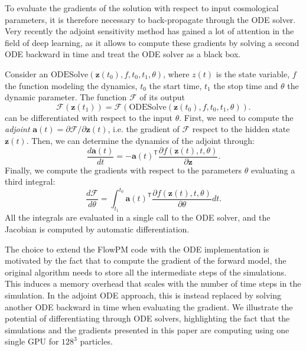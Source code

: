 \documentclass[twocolumn,twocolappendix]{aastex63}
\begin{document}
To evaluate the gradients of the solution with respect to input cosmological parameters, it is therefore necessary to  back-propagate through the ODE solver. Very recently the adjoint sensitivity method \cite{chen2018neural, pontryaginmathematical} has gained a lot of attention in the field of deep learning, as it allows to compute these gradients by solving a second ODE backward in time and treat the ODE solver as a black box. 
 
Consider an $\text{ODESolve}(\textbf{z}(t_0),f,t_0,t_1, \theta)$, 
 where $z(t)$ is the state variable, $f$ the function modeling the dynamics, $t_0$ the start time, $t_1$ the stop time and $\theta$ the dynamic parameter. The function  $\mathcal{F}$ of its output
 \begin{equation}
     \mathcal{F}(\textbf{z}(t_1))=   \mathcal{F} (\text{ODESolve}(\textbf{z}(t_0),f,t_0,t_1, \theta)).
 \end{equation}
can be differentiated with respect to the input $\theta$.
 First, we need to compute the \textit{adjoint} $\textbf{a}(t)=\partial \mathcal{F}/ \partial \textbf{z}(t)$, i.e. the gradient of $\mathcal{F}$ respect to the hidden state $\textbf{z}(t)$.  
 Then, we can determine the dynamics of the adjoint through:
 \begin{equation}
     \frac{d \textbf{a}(t)}{dt}=-\textbf{a}(t)^{ \mathsf{T}}\frac{\partial f (\textbf{z}(t),t,\theta)}{\partial \textbf{z}}.
 \end{equation}
 Finally, we compute the gradients with respect to the parameters $\theta$ evaluating a third integral:
 \begin{equation}
     \frac{d\mathcal{F}}{d\theta}=
     \int_{t_1}^{t_0} \textbf{a}(t)^{ \mathsf{T}}
     \frac{\partial f (\textbf{z}(t),t,\theta)}{\partial \theta } dt.
 \end{equation}
All the integrals are evaluated in a single call to the ODE solver, and the Jacobian is computed by automatic differentiation. 
 



The choice to extend the FlowPM code with the ODE implementation is motivated by the fact that to compute the gradient of the forward model, the original algorithm needs to store all the intermediate steps of the simulations. This induces a memory overhead that scales with the number of time steps in the simulation. In the adjoint ODE approach, this is instead replaced by solving another ODE backward in time when evaluating the gradient. 
We illustrate the potential of differentiating through ODE solvers, highlighting the fact that the simulations and the gradients presented in this paper are computing using one single GPU for $128^3$ particles. 
\end{document}
